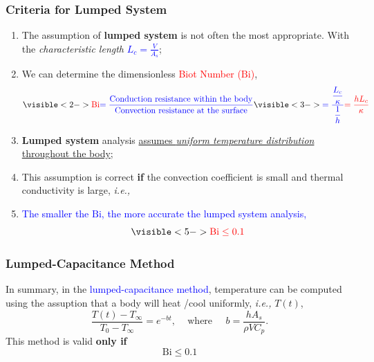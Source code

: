 \documentclass[10pt,compress,unknownkeysallowed]{beamer}
\newcommand{\ie}{{\it i.e., }}
\newcommand{\frc}{\displaystyle\frac}
\newcommand{\red}{\textcolor{red}}
\newcommand{\blue}{\textcolor{blue}}
\newcommand{\dimensionless}[1]{\mathrm{#1}}
\newcommand{\Bi}{\dimensionless{Bi}}
\begin{document}
\begin{frame}
 \frametitle{Criteria for Lumped System}
   \begin{enumerate}%
     \item<1-> The assumption of {\bf lumped system} is not often the most appropriate. With the {\it characteristic length} \blue{$L_{c}=\frc{V}{A_{s}}$};
     \item<2-> We can determine the dimensionless \red{Biot Number ($\Bi$)},
       \begin{equation}
          \visible<2->{\red{\Bi} \blue{= \frc{\text{Conduction resistance within the body}}{\text{Convection resistance at the surface}}}} \visible<3->{\blue{= \frc{\frc{L_{c}}{\kappa}}{\frc{1}{h}}} \red{= \frc{h L_{c}}{\kappa}}}
       \end{equation}  
     \item<4-> {\bf Lumped system} analysis \underline{assumes {\it uniform temperature distribution}} \underline{throughout the body};
     \item<4-> This assumption is correct {\bf if} the convection coefficient is small and thermal conductivity is large, \ie
     \item<5-> \blue{The smaller the {\bf $\Bi$}, the more accurate the lumped system analysis,} 
                     \begin{displaymath}
                       \visible<5->{ \red{\Bi \leq 0.1}}
                     \end{displaymath}
   \end{enumerate}
\end{frame}

\begin{frame}
 \frametitle{Lumped-Capacitance Method}
    \begin{shaded}
       In summary, in the \blue{lumped-capacitance method}, temperature can be computed using the assuption that a body will heat /cool uniformly, \ie $T(t)$,
          \begin{displaymath}
             \frc{T(t)-T_{\infty}}{T_{0}-T_{\infty}} = e^{-bt},\;\;\;\text{ where }\;\;\;\ b = \frc{hA_{s}}{\rho V C_{p}}.
          \end{displaymath}
This method is valid {\bf only if}
           \begin{displaymath}
               \Bi \le 0.1
           \end{displaymath}
    \end{shaded}

\end{frame}
\end{document}
